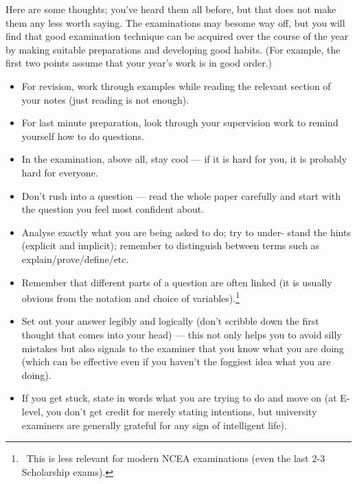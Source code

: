 \documentclass{exam}
\theoremstyle{definition}
\begin{document}
Here are some thoughts; you've heard them all before, but that does not make them any less worth saying. The examinations may besome way off, but you will find that good examination technique can be acquired over the course of the year by making suitable preparations and developing good habits. (For example, the first two points
assume that your year's work is in good order.)

\begin{itemize}
\item For revision, work through examples while reading the relevant section of your notes (just reading is not enough).

\item For last minute preparation, look through your supervision work to remind yourself how to do questions.

\item In the examination, above all, stay cool --- if it is hard for you, it is probably hard for everyone.

\item Don't rush into a question --- read the whole paper carefully and
      start with the question you feel most confident about.

\item Analyse exactly what you are being asked to do; try to under-
      stand the hints (explicit and implicit); remember to distinguish
      between terms such as explain/prove/define/etc.

\item Remember that different parts of a question are often linked (it
      is usually obvious from the notation and choice of variables).\footnote{~This is
      less relevant for modern NCEA examinations (even the last 2-3 Scholarship exams).}

\item Set out your answer legibly and logically (don't scribble down
      the first thought that comes into your head) --- this not only
      helps you to avoid silly mistakes but also signals to the examiner
      that you know what you are doing (which can be effective even
      if you haven't the foggiest idea what you are doing).

\item If you get stuck, state in words what you are trying to do and
      move on (at E-level, you don't get credit for merely stating
      intentions, but university examiners are generally grateful for
      any sign of intelligent life).
\end{itemize}
\end{document}
